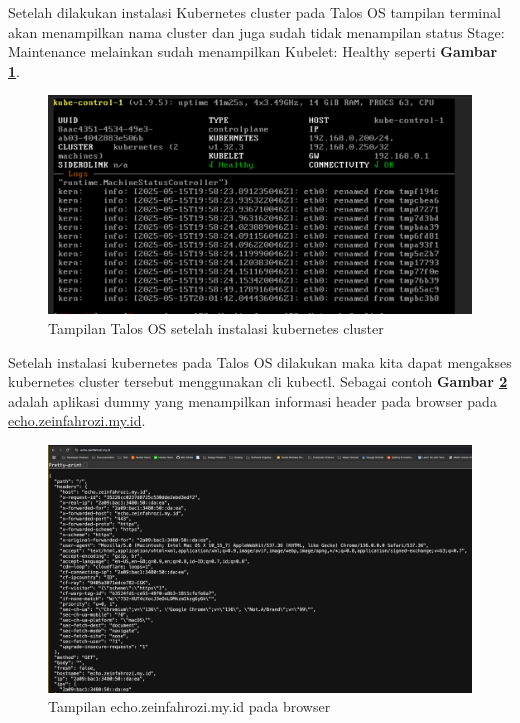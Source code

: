 Setelah dilakukan instalasi Kubernetes cluster pada Talos OS tampilan terminal
akan menampilkan nama cluster dan juga sudah tidak menampilan status Stage:
Maintenance melainkan sudah menampilkan Kubelet: Healthy seperti \textbf{Gambar
  \ref{fig:talos_install_11}}.

\begin{figure}[!ht]
  \centering
  \includegraphics[width=1\textwidth]{figures/talos-install-11.jpg}
  \caption{Tampilan Talos OS setelah instalasi kubernetes cluster}
  \label{fig:talos_install_11}
\end{figure}

Setelah instalasi kubernetes pada Talos OS dilakukan maka kita dapat mengakses
kubernetes cluster tersebut menggunakan cli kubectl. Sebagai contoh
\textbf{Gambar \ref{fig:echo_web}} adalah aplikasi dummy yang menampilkan
informasi header pada browser pada \url{echo.zeinfahrozi.my.id}.

\newpage
\begin{figure}[h]
  \centering
  \includegraphics[width=1\textwidth]{figures/echo-web.jpg}
  \caption{Tampilan echo.zeinfahrozi.my.id pada browser}
  \label{fig:echo_web}
\end{figure}

